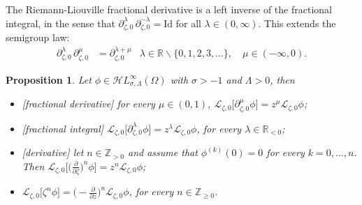 \documentclass{article}
\newcommand{\singexp}[2]{\mathcal{H}L^\infty_{#1, #2}}
\newcommand{\Z}{\mathbb{Z}}
\newcommand{\R}{\mathbb{R}}
\newcommand{\fracderiv}[3]{\partial^{#1}_{#2, #3}}
\newcommand{\laplace}{\mathcal{L}}
\theoremstyle{definition}
\theoremstyle{plain}
\newtheorem{prop}[definition]{Proposition}
\begin{document}
The Riemann-Liouville fractional derivative is a left inverse of the fractional integral, in the sense that $\fracderiv{\lambda}{\zeta}{ 0}\,\fracderiv{-\lambda}{\zeta}{0}=\text{Id}$ for all $\lambda \in (0, \infty)$. This extends the semigroup law:
\begin{align*}
\fracderiv{\lambda}{\zeta}{0}\,\fracderiv{\mu}{\zeta}{0} & = \fracderiv{\lambda+\mu}{\zeta}{0} & \lambda \in \R \smallsetminus \{0, 1, 2, 3, \ldots\},\quad\mu \in (-\infty, 0).
\end{align*}
\begin{prop}\label{prop:L-int-op}
    Let $\phi\in\singexp{\sigma}{\Lambda}(\Omega)$ with $\sigma>-1$ and $\Lambda>0$, then
    \begin{itemize}
        \item[(i)] \emph{[fractional derivative]} for every $\mu\in(0,1)$, $\laplace_{\zeta,0} \big[\fracderiv{\mu}{\zeta}{0} \phi\big] = z^{\mu} \laplace_{\zeta,0} \phi$;
         \item[(ii)] \emph{[fractional integral]} $\laplace_{\zeta,0} \big[\fracderiv{\lambda}{\zeta}{0} \phi\big] = z^{\lambda} \laplace_{\zeta,0} \phi$,
        for every $\lambda\in\R_{<0}$;
        \item[(iii)] \emph{[derivative]} let $n\in\Z_{>0}$ and assume that $ \phi^{(k)}(0)=0$ for every $k=0,\ldots,n$. Then $\laplace_{\zeta,0} \big[\big(\frac{\partial}{\partial\zeta}\big)^n \phi\big] = z^{n} \laplace_{\zeta,0} \phi$;
         \item[(iv)] $\laplace_{\zeta,0} \big[\zeta^n \phi\big] = \big(-\frac{\partial}{\partial z}\big)^n \laplace_{\zeta,0} \phi$, 
        for every $n\in\Z_{\geq 0}$.
    \end{itemize}
\end{prop}
\end{document}
